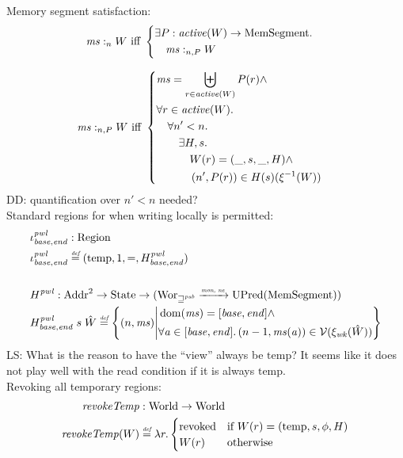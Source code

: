 \documentclass[a4paper]{article}
\newcommand{\monnefun}{\xrightarrow{\textit{\tiny{mon, ne}}}}
\newcommand{\fun}{\rightarrow}
\newcommand{\defeq}{\stackrel{\textit{\tiny{def}}}{=}}
\DeclareMathOperator{\dom}{dom}
\newcommand\lau[1]{{\color{purple} \sf \footnotesize {LS: #1}}\\}
\newcommand\dominique[1]{{\color{purple} \sf \footnotesize {DD: #1}}\\}
\newcommand{\var}[1]{\mathit{#1}}
\newcommand{\hs}{\var{ms}}
\newcommand{\ms}{\hs}
\newcommand{\addr}{\var{a}}
\newcommand{\start}{\var{base}}
\newcommand{\addrend}{\var{end}}
\newcommand{\heap}{\var{mem}}
\newcommand{\pwl}{\var{pwl}}
\newcommand{\plainfun}[2]{
  \ifthenelse{\equal{#2}{}}
  {\mathit{#1}}
  {\mathit{#1}(#2)}
}
\newcommand{\revokeTemp}[1]{\plainfun{revokeTemp}{#1}}
\newcommand{\activeReg}[1]{\plainfun{active}{#1}}
\newcommand{\futurewk}{\mathbin{\sqsupseteq}^{\var{pub}}}
\newcommand{\heapSat}[3][\heap]{#1 :_{#2} #3}
\newcommand{\memSatPar}[4][n]{\heapSat[#2]{#1 , #4}{#3}}
\newcommand{\asmType}{\plaindom{AsmType}}
\newcommand{\plaindom}[1]{\mathrm{#1}}
\newcommand{\Addrs}{\plaindom{Addr}}
\newcommand{\HeapSegments}{\plaindom{MemSegment}}
\newcommand{\States}{\plaindom{State}}
\newcommand{\Regions}{\plaindom{Region}}
\newcommand{\Worlds}{\plaindom{World}}
\newcommand{\Wor}{\plaindom{Wor}}
\newcommand{\Worwk}{\Wor_{\futurewk}}
\newcommand{\UPred}[1]{\plaindom{UPred}(#1)}
\newcommand{\intr}[2]{\mathcal{#1}}
\newcommand{\valueintr}[1]{\intr{V}{#1}}
\newcommand{\stdvr}{\valueintr{\asmType}}
\newcommand{\npair}[2][n]{\left(#1,#2 \right)}
\newcommand{\plainview}[1]{\mathrm{#1}}
\newcommand{\temp}{\plainview{temp}}
\newcommand{\revoked}{\plainview{revoked}}
\begin{document}
\begin{lemma}
Memory segment satisfaction:
\begin{align*}
  &\heapSat[\hs]{n}{W} 
    \text{ iff }
    \left\{\begin{aligned}
        &\exists P : \activeReg{W} \rightarrow \HeapSegments \ldotp \\
        &\quad \memSatPar{\ms}{W}{P}
      \end{aligned}\right.
\end{align*}

\begin{align*}
  &\memSatPar{\ms}{W}{P}
    \text{ iff }
    \left\{\begin{aligned}
        &\hs = \biguplus_{r\in\activeReg{W}}P(r) \land \\
        &\forall r \in \activeReg{W} \ldotp\\
        &\quad  \forall n'<n \ldotp \\
        &\qquad \exists H,s \ldotp\\
        &\qquad \quad W(r) = (\_,s,\_,H) \land \\
        &\qquad \quad \npair[n']{P(r)} \in H(s)(\xi^{-1}(W))\\
      \end{aligned}\right.
\end{align*}
\dominique{quantification over $n' < n$ needed?}

Standard regions for when writing locally is permitted:
\begin{align*}
  &\iota_{\start,\addrend}^\pwl : \Regions\\
  &\iota_{\start,\addrend}^\pwl \defeq (\temp,1,=,H^\pwl_{\start,\addrend}) \\
  \\
  &H^\pwl : \Addrs^2 \fun \States \fun (\Worwk \monnefun \UPred{\HeapSegments})\\
  &H^\pwl_{\start,\addrend}\; s \; \hat{W} \defeq \left\{\npair{\hs} \middle|
    \begin{aligned}
      &\dom(\hs) = [\start,\addrend] \land \\
      &\forall \addr \in [\start,\addrend] \ldotp \npair[n-1]{\hs(\addr)} \in \stdvr(\xi_{\var{wk}}(\hat{W}))
    \end{aligned}
        \right\}
\end{align*}
\lau{What is the reason to have the ``view'' always be $\temp$? It seems like it does not play well with the read condition if it is always $\temp$.}
Revoking all temporary regions:
\begin{align*}
  \revokeTemp{} & : \Worlds \fun \Worlds \\
  \revokeTemp{W} & \defeq \lambda r \ldotp 
                   \begin{cases}
                     \revoked            & \text{if }W(r) = (\temp,s,\phi,H) \\
                     W(r)                & \text{otherwise}
                   \end{cases}
\end{align*}
\newcommand{\wrev}[1]{\revokeTemp{#1}}



\end{lemma}
\end{document}
